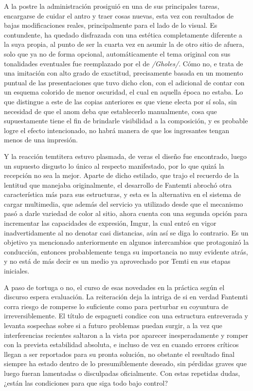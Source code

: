 \documentclass[
]{book}
\begin{document}
A la postre la administración prosiguió en una de sus principales tareas, encargarse de cuidar el antro y traer cosas nuevas, esta vez con resultados de bajas modificaciones reales, principalmente para el lado de lo visual. Es contundente, ha quedado disfrazada con una estética completamente diferente a la suya propia, al punto de ser la cuarta vez en asumir la de otro sitio de afuera, solo que ya no de forma opcional, automáticamente el tema original con sus tonalidades eventuales fue reemplazado por el de \emph{/Gholes/}. Cómo no, e trata de una imitación con alto grado de exactitud, precisamente basada en un momento puntual de las presentaciones que tuvo dicho clon, con el adicional de contar con un esquema colorido de menor oscuridad, el cual en aquella época no estaba. Lo que distingue a este de las copias anteriores es que viene electa por sí sola, sin necesidad de que el anom deba que establecerlo manualmente, cosa que supuestamente tiene el fin de brindarle visibilidad a la composición, y es probable logre el efecto intencionado, no habrá manera de que los ingresantes tengan menos de una impresión.

Y la reacción temtitera estuvo plasmada, de veras el diseño fue encontrado, luego un supuesto disgusto lo único al respecto manifestado, por lo que quizá la recepción no sea la mejor. Aparte de dicho estilado, que trajo el recuerdo de la lentitud que manejaba originalmente, el desarrollo de Fantemti abrochó otra característica más para sus estructuras, y esta es la alternativa en el sistema de cargar multimedia, que además del servicio ya utilizado desde que el mecanismo pasó a darle variedad de color al sitio, ahora cuenta con una segunda opción para incrementar las capacidades de expresión, Imgur, la cual entró en vigor inadvertidamente al no denotar casi distancias, aún así se diga lo contrario. Es un objetivo ya mencionado anteriormente en algunos intercambios que protagonizó la conducción, entonces probablemente tenga su importancia no muy evidente atrás, y no está de más decir es un medio ya aprovechado por Temti en sus etapas iniciales.

A paso de tortuga o no, el curso de esas novedades en la práctica según el discurso espera evaluación. La reiteración deja la intriga de si en verdad Fantemti corra riesgo de romperse lo suficiente como para perturbar su coyuntura de irreversiblemente. El título de espagueti condice con una estructura entreverada y levanta sospechas sobre si a futuro problemas puedan surgir, a la vez que interferencias recientes saltaron a la vista por aparecer inesperadamente y romper con la prevista estabilidad absoluta, e incluso de vez en cuando errores críticos llegan a ser reportados para su pronta solución, no obstante el resultado final siempre ha estado dentro de lo presumiblemente deseado, sin pérdidas graves que luego fueran lamentadas o disculpadas oficialmente. Con estas repetidas dudas, ¿están las condiciones para que siga todo bajo control?
\end{document}
